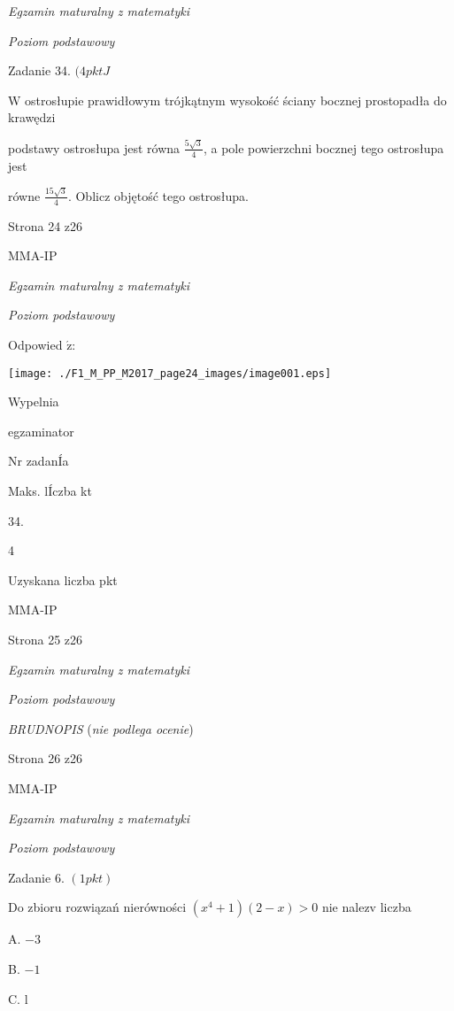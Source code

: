 \documentclass[a4paper,12pt]{article}
\begin{document}
{\it Egzamin maturalny z matematyki}

{\it Poziom podstawowy}

Zadanie 34. $(4pktJ$

$\mathrm{W}$ ostrosłupie prawidłowym trójkątnym wysokość ściany bocznej prostopadła do krawędzi

podstawy ostrosłupa jest równa $\displaystyle \frac{5\sqrt{3}}{4}$, a pole powierzchni bocznej tego ostrosłupa jest

równe $\displaystyle \frac{15\sqrt{3}}{4}$. Oblicz objętość tego ostrosłupa.

Strona 24 z26

MMA-IP





{\it Egzamin maturalny z matematyki}

{\it Poziom podstawowy}

Odpowied $\acute{\mathrm{z}}$:
\begin{center}
\texttt{[image: ./F1\_M\_PP\_M2017\_page24\_images/image001.eps]}
\end{center}
Wypelnia

egzaminator

Nr zadanÍa

Maks. lÍczba kt

34.

4

Uzyskana liczba pkt

MMA-IP

Strona 25 z26





{\it Egzamin maturalny z matematyki}

{\it Poziom podstawowy}

{\it BRUDNOPIS} ({\it nie podlega ocenie})

Strona 26 z26

MMA-IP





{\it Egzamin maturalny z matematyki}

{\it Poziom podstawowy}

Zadanie 6. $(1pkt)$

Do zbioru rozwiązań nierówności $(x^{4}+1)(2-x)>0$ nie nalez$\mathrm{v}$ liczba

A. $-3$

B. $-1$

C. l
\end{document}

